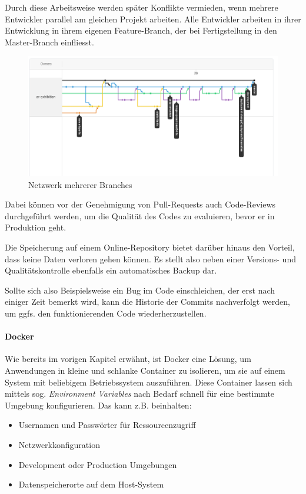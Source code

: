\documentclass[titlepage, a4paper, 11pt]{scrartcl}
\begin{document}
          Durch diese Arbeitsweise werden später Konflikte vermieden, wenn mehrere Entwickler parallel am gleichen Projekt arbeiten.
          Alle Entwickler arbeiten in ihrer Entwicklung in ihrem eigenen Feature-Branch, der bei Fertigstellung in den Master-Branch einfliesst.

          \begin{figure}[h]
            \centering
            \includegraphics[width=.6\textwidth]{gitBranches.PNG}
            \caption{Netzwerk mehrerer Branches}
            \label{GitNetworks}
          \end{figure}
          
          Dabei können vor der Genehmigung von Pull-Requests auch Code-Reviews durchgeführt werden, um die Qualität des Codes zu evaluieren,
          bevor er in Produktion geht.
          
          Die Speicherung auf einem Online-Repository bietet darüber hinaus den Vorteil, dass keine Daten verloren gehen können.
          Es stellt also neben einer Versions- und Qualitätskontrolle ebenfalls ein automatisches Backup dar.

          Sollte sich also Beispielsweise ein Bug im Code einschleichen, der erst nach einiger Zeit bemerkt wird, kann die Historie
          der Commits nachverfolgt werden, um ggfs. den funktionierenden Code wiederherzustellen.

        \paragraph{Docker}

          Wie bereits im vorigen Kapitel erwähnt, ist Docker eine Lösung, um Anwendungen in kleine und schlanke Container zu isolieren, um sie auf einem System mit beliebigem 
          Betriebssystem auszuführen. Diese Container lassen sich mittels sog. \textit{Environment Variables} nach Bedarf schnell für eine bestimmte Umgebung konfigurieren.
          Das kann z.B. beinhalten:

          \begin{itemize}
            \item Usernamen und Passwörter für Ressourcenzugriff
            \item Netzwerkkonfiguration
            \item Development oder Production Umgebungen
            \item Datenspeicherorte auf dem Host-System
          \end{itemize}
\end{document}
